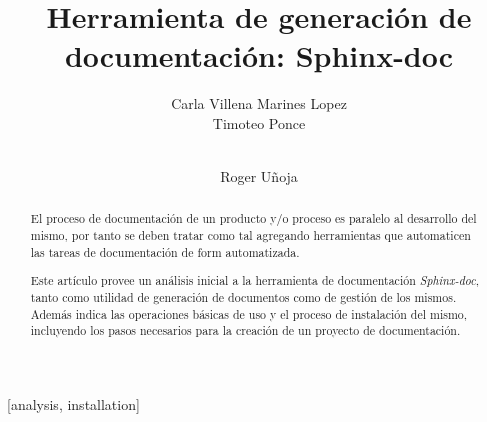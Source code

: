 \documentclass{sig-alternate}
\begin{document}
%

\title{Herramienta de generaci\'on de documentaci\'on: Sphinx-doc}

%
\author{
\alignauthor
Carla Villena
\alignauthor
Marines Lopez\\
\alignauthor 
Timoteo Ponce\\
       \\
\and  %
\alignauthor 
	Roger U\~noja\\
}

\maketitle
\begin{abstract}
  El proceso de documentaci\'on de un producto y/o proceso 
  es paralelo al desarrollo del mismo, por tanto se deben 
  tratar como tal agregando herramientas que automaticen
  las tareas de documentaci\'on de form automatizada.

  Este art\'iculo provee un an\'alisis inicial a la 
  herramienta de documentaci\'on \emph{Sphinx-doc}, tanto como utilidad
  de generaci\'on de documentos como de gesti\'on de los 
  mismos. Adem\'as indica las operaciones b\'asicas de 
  uso y el proceso de instalaci\'on del mismo, incluyendo 
  los pasos necesarios para la creaci\'on de un proyecto
  de documentaci\'on.

\end{abstract}

[analysis, installation]
\end{document}
